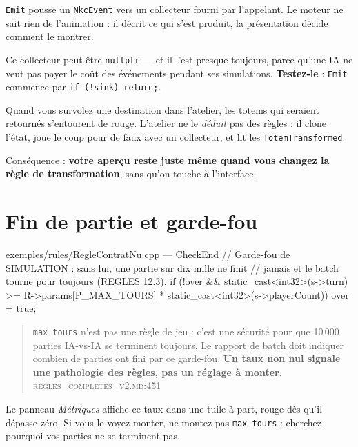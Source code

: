 \texttt{Emit} pousse un \texttt{NkcEvent} vers un collecteur fourni par
l'appelant. Le moteur ne sait rien de l'animation : il décrit ce qui s'est
produit, la présentation décide comment le montrer.

Ce collecteur peut être \texttt{nullptr} — et il l'est presque toujours, parce
qu'une IA ne veut pas payer le coût des événements pendant ses simulations.
\textbf{Testez-le} : \texttt{Emit} commence par \texttt{if (!sink) return;}.

\begin{nkretenir}
Quand vous survolez une destination dans l'atelier, les totems qui seraient
retournés s'entourent de rouge. L'atelier ne le \emph{déduit} pas des règles : il
clone l'état, joue le coup pour de faux avec un collecteur, et lit les
\texttt{TotemTransformed}.

Conséquence : \textbf{votre aperçu reste juste même quand vous changez la règle de
transformation}, sans qu'on touche à l'interface.
\end{nkretenir}

\section{Fin de partie et garde-fou}

\begin{nkcode}{exemples/rules/RegleContratNu.cpp — CheckEnd}
// Garde-fou de SIMULATION : sans lui, une partie sur dix mille ne finit
// jamais et le batch tourne pour toujours (REGLES 12.3).
if (!over && static_cast<int32>(s->turn) >=
                 R->params[P_MAX_TOURS] * static_cast<int32>(s->playerCount))
    over = true;
\end{nkcode}

\begin{nkpiege}
\begin{quote}\small
\texttt{max\_tours} n'est pas une règle de jeu : c'est une sécurité pour que
10\,000 parties IA-vs-IA se terminent toujours. Le rapport de batch doit indiquer
combien de parties ont fini par ce garde-fou. \textbf{Un taux non nul signale une
pathologie des règles, pas un réglage à monter.}
\hfill\textsc{regles\_completes\_v2.md:451}
\end{quote}

Le panneau \emph{Métriques} affiche ce taux dans une tuile à part, rouge dès
qu'il dépasse zéro. Si vous le voyez monter, ne montez pas \texttt{max\_tours} :
cherchez pourquoi vos parties ne se terminent pas.
\end{nkpiege}

